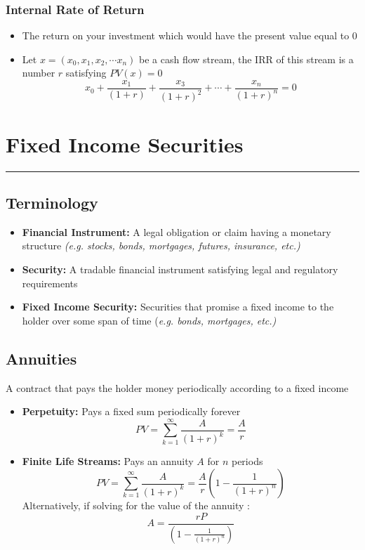 \documentclass[11pt]{article}
\begin{document}
\subsubsection{Internal Rate of Return}
\begin{itemize}
\item The return on your investment which would have the present value equal to 0
\item Let $x = (x_0, x_1, x_2, \cdots x_n)$ be a cash flow stream, the IRR of this stream is a number $r$ satisfying $PV(x) = 0$ 
$$ x_0 + \frac{x_1}{(1+r)} + \frac{x_3}{(1+r)^2} + \cdots + \frac{x_n}{(1+r)^n} = 0$$
\end{itemize}

\pagebreak

\section{Fixed Income Securities}
\hrule \vspace{15pt}

\subsection{Terminology}
\begin{itemize}
\item \textbf{Financial Instrument:} A legal obligation or claim having a monetary structure \textit{(e.g. stocks, bonds, mortgages, futures, insurance, etc.)}
\item \textbf{Security:} A tradable financial instrument satisfying legal and regulatory requirements 
\item \textbf{Fixed Income Security:} Securities that promise a fixed income to the holder over some span of time (\textit{e.g. bonds, mortgages, etc.)}
\end{itemize}
\subsection{Annuities}
A contract that pays the holder money periodically according to a fixed income 
\begin{itemize}
\item \textbf{Perpetuity:} Pays a fixed sum periodically forever
$$ PV = \sum_{k=1}^{\infty} \frac{A}{(1+r)^k} = \frac{A}{r} $$ 
\item \textbf{Finite Life Streams:}  Pays an annuity $A$ for $n$ periods
$$ PV = \sum_{k=1}^{\infty} \frac{A}{(1+r)^k} = \frac{A}{r} \left( 1 - \frac{1}{(1+r)^n} \right)$$ 
Alternatively, if solving for the value of the annuity :
$$ A = \frac{r P}{ \left( 1 - \frac{1}{(1+r)^n} \right) } $$ 
\end{itemize}
\end{document}
